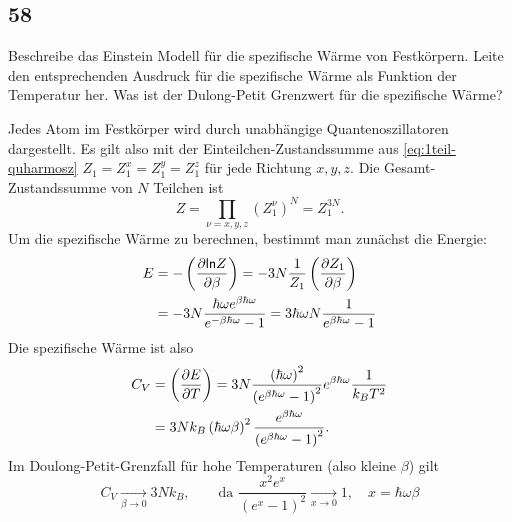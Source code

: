 \subsection{58}
\begin{myfrag}
Beschreibe das Einstein Modell für die spezifische Wärme von Festkörpern.
Leite den entsprechenden Ausdruck für die spezifische Wärme als Funktion
der Temperatur her. Was ist der Dulong-Petit Grenzwert für die spezifische
Wärme?
\end{myfrag}
Jedes Atom im Festkörper wird durch unabhängige Quantenoszillatoren dargestellt. Es gilt also mit der Einteilchen-Zustandssumme aus \eqref{eq:1teil-quharmosz} $Z_1=Z_1^x=Z_1^y=Z_1^z$ für jede Richtung $x,y,z$. Die Gesamt-Zustandssumme von $N$ Teilchen ist 
\begin{equation}
	Z=\prod\limits_{\nu=x,y,z}\left(Z_1^\nu\right)^N=Z_1^{3N}.
\end{equation}
 Um die spezifische Wärme zu berechnen, bestimmt man zunächst die Energie:
\begin{align}
	E&=-\left(\frac{\partial \mathsf{ln} Z}{\partial \beta}\right)=-3N\frac{1}{Z_1}\left(\frac{\partial Z_1}{\partial \beta}\right)\\
	&=-3N\frac{\hbar\omega e^{\beta\hbar\omega}}{e^{-\beta\hbar\omega}-1}=3\hbar\omega N\frac{1}{e^{\beta\hbar\omega}-1}
\end{align}
Die spezifische Wärme ist also
\begin{align}
	C_V&=\left(\frac{\partial E}{\partial T}\right)=3N\frac{\left(\hbar\omega\right)^2}{\left(e^{\beta\hbar\omega}-1\right)^2}e^{\beta\hbar\omega}\frac{1}{k_BT^2}\\
	&=3Nk_B\left(\hbar\omega\beta\right)^2\frac{e^{\beta\hbar\omega}}{\left(e^{\beta\hbar\omega}-1\right)^2}.
\end{align}
Im Doulong-Petit-Grenzfall für hohe Temperaturen (also kleine $\beta$) gilt
\begin{equation}
  C_V\underset{\beta\rightarrow 0}\longrightarrow3Nk_B,\qquad\text{da }\frac{x^2e^x}{\left(e^x-1\right)^2}\underset{x\rightarrow 0}\longrightarrow 1, \quad x=\hbar\omega\beta
\end{equation}

